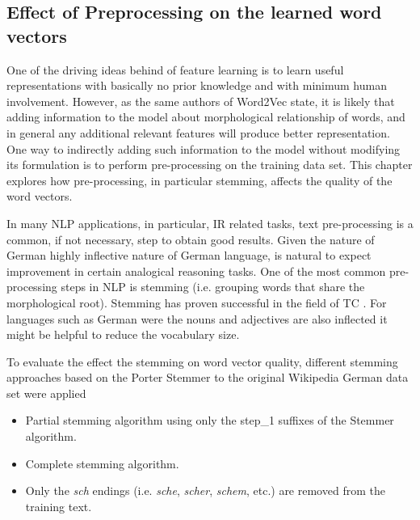 

\subsection{Effect of Preprocessing on the learned word vectors}
\label{sec:sub:effects_of_preprocessing_on_learned_word_vectors}

One of the driving ideas behind of feature learning is to learn useful
representations with basically no prior knowledge and with minimum human
involvement. However, as the same authors of Word2Vec state, it is likely
that adding information to the model about morphological relationship of
words, and in general any additional relevant features will produce better
representation.  One way to indirectly adding such information to the model
without modifying its formulation is to perform pre-processing on the training
data set. This chapter explores how pre-processing, in particular stemming,  affects the
quality of the word vectors. 
 

In many \ac{NLP} applications, in particular, \ac{IR} related tasks,  text pre-processing is  a common, if not
necessary, step to obtain good results. Given the nature of German highly
inflective nature of German language, is natural to expect improvement in
certain analogical reasoning tasks.  One of the most common pre-processing steps in NLP is stemming (i.e. grouping
words that share the morphological root). Stemming has proven successful in
the field of \ac{TC} \cite{Sebastiani02}. For languages such as  German were the nouns and
adjectives are also inflected it might be helpful to reduce the vocabulary
size.  

To evaluate the effect the stemming on word vector quality, different
stemming approaches based on the Porter Stemmer \cite{Porter80}  to the original Wikipedia
German data set were applied

\begin{itemize} 
\item Partial stemming algorithm using only the step\_1 suffixes of the
  Stemmer algorithm.
\item Complete stemming algorithm.
\item Only the \textit{sch} endings (i.e. \textit{sche}, \textit{scher},
   \textit{schem}, etc.) are removed from the training text.
\end{itemize} 

